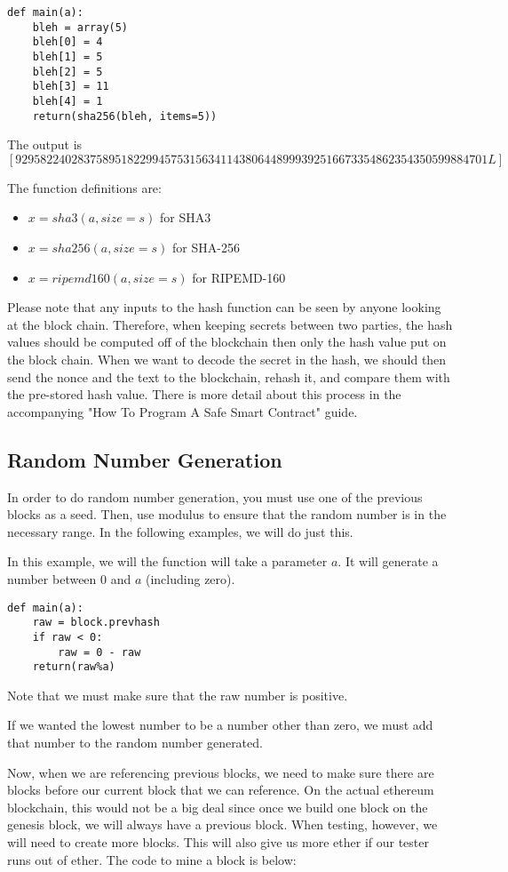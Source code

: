 \documentclass[12pt]{article}
\begin{document}
\begin{verbatim}
def main(a):
	bleh = array(5)
	bleh[0] = 4
	bleh[1] = 5
	bleh[2] = 5
	bleh[3] = 11
	bleh[4] = 1
	return(sha256(bleh, items=5))
\end{verbatim}
The output is $[9295822402837589518229945753156341143806448999392516673354862354350599884701L]$

The function definitions are:
\begin{itemize}
	\item $x = sha3(a, size=s)$ for SHA3
	\item $x = sha256(a, size=s)$ for SHA-256
	\item $x = ripemd160(a, size=s)$ for RIPEMD-160
\end{itemize}

Please note that any inputs to the hash function can be seen by anyone looking at the block chain. Therefore, when keeping secrets between two parties, the hash values should be computed off of the blockchain then only the hash value put on the block chain. When we want to decode the secret in the hash, we should then send the nonce and the text to the blockchain, rehash it, and compare them with the pre-stored hash value. There is more detail about this process in the accompanying "How To Program A Safe Smart Contract" guide.

\subsection{Random Number Generation}
In order to do random number generation, you must use one of the previous blocks as a seed. Then, use modulus to ensure that the random number is in the necessary range. In the following examples, we will do just this.

In this example, we will the function will take a parameter $a$. It will generate a number between 0 and $a$ (including zero).

\begin{verbatim}
def main(a):
	raw = block.prevhash
	if raw < 0:
		raw = 0 - raw
	return(raw%a)
\end{verbatim}

Note that we must make sure that the raw number is positive. \cite{PeterBorah2014}

If we wanted the lowest number to be a number other than zero, we must add that number to the random number generated. 

Now, when we are referencing previous blocks, we need to make sure there are blocks before our current block that we can reference. On the actual ethereum blockchain, this would not be a big deal since once we build one block on the genesis block, we will always have a previous block. When testing, however, we will need to create more blocks. This will also give us more ether if our tester runs out of ether. The code to mine a block is below:
\end{document}
